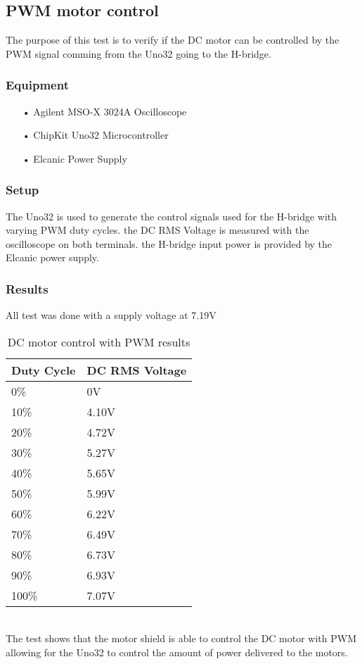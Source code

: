 \subsection{PWM motor control}
The purpose of this test is to verify if the DC motor can be controlled by the PWM signal comming from the Uno32 going to the H-bridge.
 
\subsubsection{Equipment}
\begin{enumerate}
	\item[•]Agilent MSO-X 3024A Oscilloscope
	\item[•]ChipKit Uno32 Microcontroller
	\item[•]Elcanic Power Supply
\end{enumerate}
 
\subsubsection{Setup}
The Uno32 is used to generate the control signals used for the H-bridge with varying PWM duty cycles. the DC RMS Voltage is measured with the oscilloscope on both terminals.
the H-bridge input power is provided by the Elcanic power supply.
 
\subsubsection{Results}
All test was done with a supply voltage at 7.19V
\begin{table}[h]
\centering
\begin{tabular}{|l|l|}
\hline
\textbf{Duty Cycle} & \textbf{DC RMS Voltage} \\ \hline
0\%                 & 0V                      \\ \hline
10\%                & 4.10V                   \\ \hline
20\%                & 4.72V                   \\ \hline
30\%                & 5.27V                   \\ \hline
40\%                & 5.65V                   \\ \hline
50\%                & 5.99V                   \\ \hline
60\%                & 6.22V                   \\ \hline
70\%                & 6.49V                   \\ \hline
80\%                & 6.73V                   \\ \hline
90\%                & 6.93V                   \\ \hline
100\%               & 7.07V                   \\ \hline
\end{tabular}
\caption{DC motor control with PWM results}
\label{dcpwmresults}
\end{table}\\
The test shows that the motor shield is able to control the DC motor with PWM allowing for the Uno32 to control the amount of power delivered to the motors.
